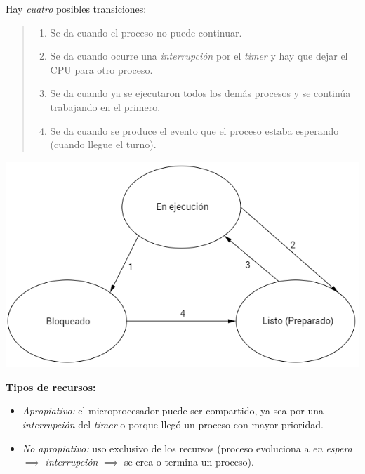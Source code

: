 \documentclass[a4paper,10pt,spanish]{article}
\begin{document}
\begin{minipage}{0.5\linewidth}

Hay \textit{cuatro} posibles transiciones:

\begin{quote}
\begin{enumerate}[1.]
\item Se da cuando el proceso no puede continuar.
\item Se da cuando ocurre una \textit{interrupción} por el \textit{timer} y hay que dejar el CPU para otro proceso.
\item Se da cuando ya se ejecutaron todos los demás procesos y se continúa trabajando en el primero.
\item Se da cuando se produce el evento que el proceso estaba esperando (cuando llegue el turno). \\
\end{enumerate}
\end{quote}

\end{minipage} \hfill \begin{minipage}{0.5\linewidth}

\includegraphics[width=\linewidth]{estados.png}

\end{minipage}

\textbf{Tipos de recursos:}

\begin{itemize}
\item \textit{Apropiativo:} el microprocesador puede ser compartido, ya sea por una \textit{interrupción} del \textit{timer} o porque llegó un proceso con mayor prioridad.

\item \textit{No apropiativo:} uso exclusivo de los recursos (proceso evoluciona a \textit{en espera} $\implies$ \textit{interrupción} $\implies$ se crea o termina un proceso).
\end{itemize}
\end{document}
